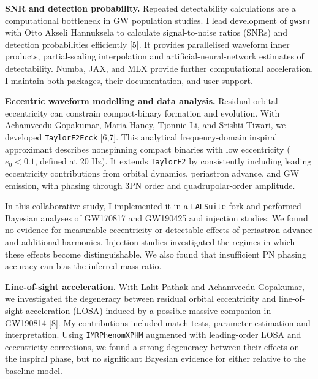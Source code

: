 \documentclass[11pt]{article}
\begin{document}
\textbf{SNR and detection probability.} Repeated detectability calculations are a computational bottleneck in GW population studies. I lead development of \texttt{gwsnr} with Otto Akseli Hannuksela to calculate signal-to-noise ratios (SNRs) and detection probabilities efficiently [5]. It provides parallelised waveform inner products, partial-scaling interpolation and artificial-neural-network estimates of detectability. Numba, JAX, and MLX provide further computational acceleration. I maintain both packages, their documentation, and user support.

\textbf{Eccentric waveform modelling and data analysis.} Residual orbital eccentricity can constrain compact-binary formation and evolution. With Achamveedu Gopakumar, Maria Haney, Tjonnie Li, and Srishti Tiwari, we developed \texttt{TaylorF2Ecck} [6,7]. This analytical frequency-domain inspiral approximant describes nonspinning compact binaries with low eccentricity ($e_0<0.1$, defined at 20 Hz). It extends \texttt{TaylorF2} by consistently including leading eccentricity contributions from orbital dynamics, periastron advance, and GW emission, with phasing through 3PN order and quadrupolar-order amplitude.

In this collaborative study, I implemented it in a \texttt{LALSuite} fork and performed Bayesian analyses of GW170817 and GW190425 and injection studies. We found no evidence for measurable eccentricity or detectable effects of periastron advance and additional harmonics. Injection studies investigated the regimes in which these effects become distinguishable. We also found that insufficient PN phasing accuracy can bias the inferred mass ratio.

\textbf{Line-of-sight acceleration.} With Lalit Pathak and Achamveedu Gopakumar, we investigated the degeneracy between residual orbital eccentricity and line-of-sight acceleration (LOSA) induced by a possible massive companion in GW190814 [8]. My contributions included match tests, parameter estimation and interpretation. Using \texttt{IMRPhenomXPHM} augmented with leading-order LOSA and eccentricity corrections, we found a strong degeneracy between their effects on the inspiral phase, but no significant Bayesian evidence for either relative to the baseline model.

\newpage
\end{document}
